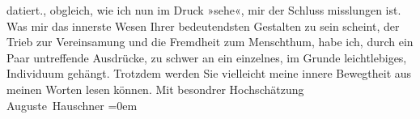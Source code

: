 \begin{ledgroupsized}[t]{13cm}
{{{                  datiert.}}}\label{K_L02587-1h}, obgleich, wie ich nun im Druck »sehe«,  mir der Schluss misslungen ist. Was mir das innerste Wesen Ihrer
               bedeutendsten Gestalten zu sein scheint, {\pb}der Trieb zur
               Vereinsamung und die Fremdheit zum Menschthum, habe ich, durch ein Paar untreffende
               Ausdrücke, zu schwer an ein einzelnes, im Grunde leichtlebiges, Individuum gehängt.
               Trotzdem werden Sie vielleicht meine innere Bewegtheit aus meinen Worten lesen
               können.\pend
           \pstart
           Mit besondrer Hochschätzung{\\[\baselineskip]}\spacefill\mbox{Auguste Hauschner}\pend
           \leftskip=0em{}\endnumbering{}\end{ledgroupsized}  \newcommand{\dateiname}{L02587}\newcommand{\titel}{Auguste Hauschner an Arthur Schnitzler, 16. 1. 1909}\newcommand{\editorInnen}{Martin Anton Müller und Laura Untner}
            \footnotesize
\begin{ledgroupsized}[t]{11.5cm}
\end{ledgroupsized}
         
      